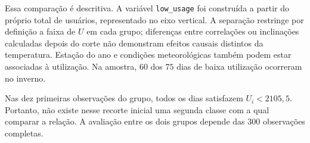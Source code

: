 \documentclass[11pt,a4paper]{article}
\begin{document}
Essa comparação é descritiva. A variável \texttt{low\_usage} foi construída
a partir do próprio total de usuários, representado no eixo vertical. A
separação restringe por definição a faixa de $U$ em cada grupo; diferenças
entre correlações ou inclinações calculadas depois do corte não demonstram
efeitos causais distintos da temperatura. Estação do ano e condições
meteorológicas também podem estar associadas à utilização. Na amostra,
$60$ dos $75$ dias de baixa utilização ocorreram no inverno.

Nas dez primeiras observações do grupo, todos os dias satisfazem
$U_i<2105{,}5$. Portanto, não existe nesse recorte inicial uma segunda
classe com a qual comparar a relação. A avaliação entre os dois grupos
depende das $300$ observações completas.
\end{document}

